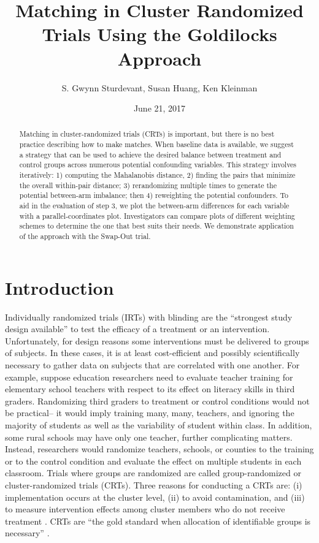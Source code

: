 \documentclass[]{article}
\title{Matching in Cluster Randomized Trials Using the Goldilocks Approach}
\author{S. Gwynn Sturdevant, Susan Huang, Ken Kleinman}
\date{June 21, 2017}
\begin{document}
\maketitle
\begin{abstract}
Matching in cluster-randomized trials (CRTs) is important, but there is
no best practice describing how to make matches. When baseline data is
available, we suggest a strategy that can be used to achieve the desired
balance between treatment and control groups across numerous potential
confounding variables. This strategy involves iteratively: 1) computing
the Mahalanobis distance, 2) finding the pairs that minimize the overall
within-pair distance; 3) rerandomizing multiple times to generate the
potential between-arm imbalance; then 4) reweighting the potential
confounders. To aid in the evaluation of step 3, we plot the between-arm
differences for each variable with a parallel-coordinates plot.
Investigators can compare plots of different weighting schemes to
determine the one that best suits their needs. We demonstrate
application of the approach with the Swap-Out trial.
\end{abstract}

\section{Introduction}\label{introduction}

Individually randomized trials (IRTs) with blinding are the ``strongest
study design available'' \citep{gatsonis2017methods} to test the
efficacy of a treatment or an intervention. Unfortunately, for design
reasons some interventions must be delivered to groups of subjects. In
these cases, it is at least cost-efficient and possibly scientifically
necessary to gather data on subjects that are correlated with one
another. For example, suppose education researchers need to evaluate
teacher training for elementary school teachers with respect to its
effect on literacy skills in third graders. Randomizing third graders to
treatment or control conditions would not be practical-- it would imply
training many, many, teachers, and ignoring the majority of students as
well as the variability of student within class. In addition, some rural
schools may have only one teacher, further complicating matters.
Instead, researchers would randomize teachers, schools, or counties to
the training or to the control condition and evaluate the effect on
multiple students in each classroom. Trials where groups are randomized
are called group-randomized or cluster-randomized trials (CRTs). Three
reasons for conducting a CRTs are: (i) implementation occurs at the
cluster level, (ii) to avoid contamination, and (iii) to measure
intervention effects among cluster members who do not receive treatment
\citep{balzer2012match, CRTrials2009}. CRTs are ``the gold standard when
allocation of identifiable groups is necessary''
\citep{murray2004design}.
\end{document}
